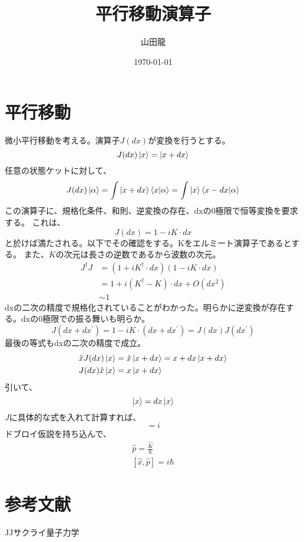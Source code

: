 \documentclass{jsarticle}
\date{\today}
\author{山田龍}
\title{平行移動演算子}
\newcommand{\beq}{\begin{equation}}
\newcommand{\eeq}{\end{equation}}
\begin{document}
\maketitle
\section{平行移動}
微小平行移動を考える。演算子$J(dx)$が変換を行うとする。
\beq
J(dx)\ket{x} = \ket{x + dx}
\eeq
任意の状態ケットに対して、
\beq
    J(dx) \ket{\alpha} = \int \ket{x+dx} \braket{x|\alpha} = \int \ket{x} \braket{x-dx|\alpha}
\eeq
この演算子に、規格化条件、和則、逆変換の存在、dxの0極限で恒等変換を要求する。
これは、
\beq
    J(dx) = 1 - i K \cdot dx
\eeq
と於けば満たされる。以下でその確認をする。Kをエルミート演算子であるとする。
また、$K$の次元は長さの逆数であるから波数の次元。
\begin{align}
    J^\dagger J &= (1 + i K^\dagger \cdot dx)(1 - i K \cdot dx)\\
                &= 1 + i (K^\dagger - K) \cdot dx + O(dx^2)\\
                &\sim 1
\end{align}
dxの二次の精度で規格化されていることがわかった。明らかに逆変換が存在する。dxの0極限での振る舞いも明らか。
\beq
J(dx + dx^\prime) = 1 - i K \cdot (dx + dx^\prime) = J(dx) J(dx^\prime)
\eeq
最後の等式もdxの二次の精度で成立。
\begin{align}
    \hat{x} J(dx) \ket{x} &= \hat{x}\ket{x+dx} = x+dx\ket{x+dx}\\
    J(dx) \hat{x} \ket{x} &= x\ket{x+dx}
\end{align}
引いて、
\beq
    [\hat{x}, J(dx)] \ket{x} = dx\ket{x}
\eeq
$J$に具体的な式を入れて計算すれば、
\beq
[\hat{x}, \hat{K}] = i
\eeq
ドブロイ仮説を持ち込んで、
\begin{align}
    \hat{p} = \frac{\hat{K}}{\hbar}\\
    [\hat{x}, \hat{p}] = i\hbar
\end{align}
\section{参考文献}
JJサクライ量子力学
\end{document}
